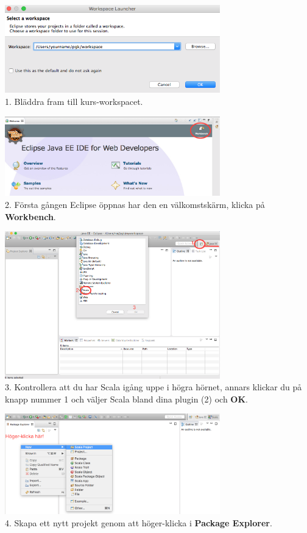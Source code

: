 \begin{center}

\includegraphics[width=0.7\textwidth]{../img/pirates/selectws.png} \\
1. Bläddra fram till kurs-workspacet. \\
\vspace{5mm}

\includegraphics[width=0.7\textwidth]{../img/pirates/selectws2.png} \\
2. Första gången Eclipse öppnas har den en välkomstskärm, klicka på {\bf Workbench}.
\vspace{5mm}

\includegraphics[width=0.7\textwidth]{../img/pirates/selectscala.png} \\
3. Kontrollera att du har Scala igång uppe i högra hörnet, annars klickar du på knapp nummer 1 och väljer Scala bland dina plugin (2) och {\bf OK}. 

\vspace{5mm}

\includegraphics[width=0.7\textwidth]{../img/pirates/createproject.png} \\
4. Skapa ett nytt projekt genom att höger-klicka i {\bf Package Explorer}.


\end{center}
